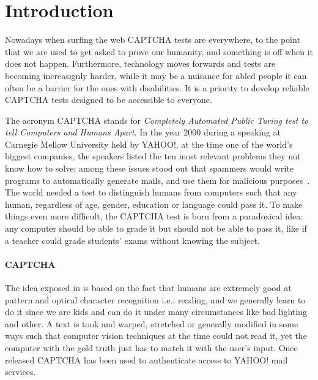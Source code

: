 \section{Introduction}
Nowadays when surfing the web CAPTCHA tests are everywhere, to the point that we are used to get asked to prove our humanity, and something is off when it does not happen.
Furthermore, technology moves forwards and tests are becoming increasignly harder, while it may be a nuisance for abled people it can often be a barrier for the ones with disabilities.
It is a priority to develop reliable CAPTCHA tests designed to be accessible to everyone.

The acronym CAPTCHA stands for \emph{Completely Automated Public Turing test to tell Computers and Humans Apart}.
In the year 2000 during a speaking at Carnegie Mellow University held by YAHOO!, at the time one of the world's biggest companies, the speakers listed the ten most relevant problems they not know how to solve; among these issues stood out that spammers would write programs to automatically generate mails, and use them for malicious purposes~\cite{vox2021captcha,theverge2019captcha}.
The world needed a test to distinguish humans from computers such that any human, regardless of age, gender, education or language could pass it.
To make things even more difficult, the CAPTCHA test is born from a paradoxical idea: any computer should be able to grade it but should not be able to pass it, like if a teacher could grade students' exams without knowing the subject.

\paragraph{CAPTCHA}
The idea exposed in \cite{vonahn2003captcha} is based on the fact that humans are extremely good at pattern and optical character recognition i.e., reading, and we
generally learn to do it since we are kids and can do it under many circumstances like bad lighting and other.
A text is took and warped, stretched or generally modified in some ways such that computer vision techniques at the time could not read it, yet the computer with the gold truth just has to match it with the user's input.
Once released CAPTCHA has been used to authenticate access to YAHOO! mail services.

